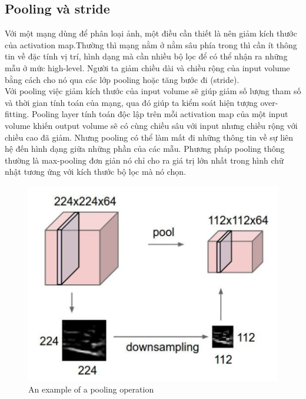 \subsection{Pooling và stride} 
Với một mạng dùng để phân loại ảnh, một điều cần thiết là nên giảm kích thước của activation map.Thường thì mạng nằm ở nằm sâu phía trong thì cần ít thông tin về đặc tính vị trí, hình dạng mà cần nhiều bộ lọc để có thể nhận ra những mẫu ở mức high-level. Người ta giảm chiều dài và chiều rộng của input volume bằng cách cho nó qua các lớp pooling hoặc tăng bước đi (stride).\\

Với pooling việc giảm kích thước của input volume sẽ giúp giảm số lượng tham số và thời gian tính toán của mạng, qua đó giúp ta kiểm soát hiện tượng over-fitting. Pooling layer tính toán độc lập trên mỗi activation map của một input volume khiến output volume sẽ có cùng chiều sâu với input nhưng chiều rộng với chiều cao đã giảm. Nhưng pooling có thể làm mất đi những thông tin về sự liên hệ đến hình dạng giữa những phần của các mẫu. Phương pháp pooling thông thường là max-pooling đơn giản nó chỉ cho ra giá trị lớn nhất trong hình chữ nhật tương ứng với kích thước bộ lọc mà nó chọn.\\
\begin{center}
    \begin{figure}[htp]
    \begin{center}
     \includegraphics[scale=.5]{image/pooling}
    \end{center}
    \caption{An example of a pooling operation}
    \label{ref_chapter3_cnn}
    \end{figure}
\end{center}


